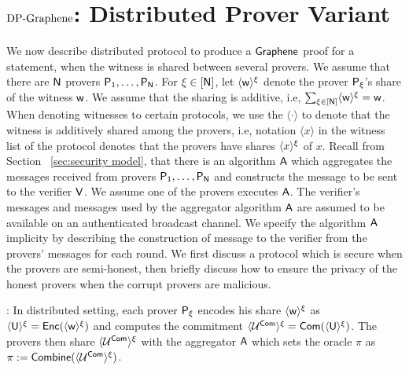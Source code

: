 \section{$\text{DP-Graphene}$: Distributed Prover Variant}\label{sec:dpgraphen}
We now describe distributed protocol to produce a $\textsf{Graphene}$ proof for a
statement, when the witness is shared between several provers. We assume that
there are $\mathsf{N}$ provers $\mathsf{P}_1,\ldots,\mathsf{P}_{\mathsf{N}}$. For $\xi\in [\mathsf{N}]$,
let $\langle{\mathsf{w}}\rangle^\xi$ denote the prover $\mathsf{P}_\xi$'s share of the witness $\mathsf{w}$.
We assume that the sharing is additive, i.e, $\sum_{\xi\in [\mathsf{N}]} \langle{\mathsf{w}}\rangle^\xi =
\mathsf{w}$. When denoting witnesses to certain protocols, we use the %
$\langle {\cdot} \rangle$ to denote that the witness is additively
shared among the provers, i.e, notation $\langle x \rangle$ in the witness list
of the protocol denotes that the provers have shares $\langle{x}\rangle^\xi$ of $x$. Recall
from Section ~\ref{sec:security model}, that there is an algorithm $\mathsf{A}$ 
which aggregates the messages received
from provers $\mathsf{P}_1,\ldots,\mathsf{P}_{\mathsf{N}}$ and constructs the message to be
sent to the verifier $\mathsf{V}$. We assume one of the provers executes $\mathsf{A}$.
The verifier's  messages and messages used by the aggregator algorithm $\mathsf{A}$ 
are assumed to be available on an authenticated broadcast
channel. We specify the algorithm $\mathsf{A}$ implicity by describing the construction
of message to the verifier from the provers' messages for each round.
We first discuss a protocol which is secure when the provers are semi-honest, then 
briefly discuss how to ensure the privacy of the honest provers when the corrupt 
provers are malicious. 

: In distributed setting, each prover
$\mathsf{P}_\xi$ encodes his share $\langle{\mathsf{w}}\rangle^\xi$ as $\langle{\mathsf{U}}\rangle^\xi=\mathsf{Enc}(\langle{\mathsf{w}}\rangle^\xi)$
and computes the commitment $\langle{\mathcal{U}^{\mathsf{Com}}}\rangle^\xi=\mathsf{Com}(\langle{\mathsf{U}}\rangle^\xi)$. The provers
then share $\langle{\mathcal{U}^{\mathsf{Com}}}\rangle^\xi$ with the aggregator $\mathsf{A}$ which sets the oracle
$\pi$ as $\pi := \mathsf{Combine}(\langle{\mathcal{U}^{\mathsf{Com}}}\rangle^\xi)$.  

